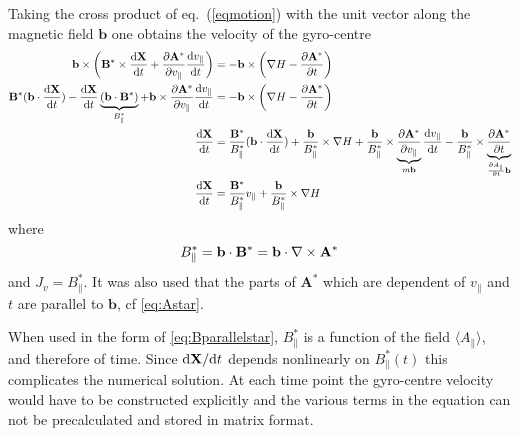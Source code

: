 Taking the cross product of eq.~(\ref{eqmotion}) with the unit vector along the magnetic field $\mathbf{b}$ one obtains the velocity of the gyro-centre 
\begin{align} 
\mathbf{b}\times\left(\mathbf{B}^* \times \frac{\mathrm{d} \bf X}{\mathrm{d} t} + \frac{\partial {\bf A}^*}{\partial v_\parallel} \frac{\mathrm{d} v_\parallel}{\mathrm{d} t} \right)
&= - \mathbf{b}\times\left(\nabla H - \frac{\partial {\bf A}^*}{\partial t}\right)
\\
\mathbf{B}^*(\mathbf{b}\cdot\frac{\mathrm{d} \bf X}{\mathrm{d} t}) - \frac{\mathrm{d} \bf X}{\mathrm{d} t}\underbrace{(\mathbf{b}\cdot\mathbf{B}^*)}_{B^*_\parallel}
+ \mathbf{b}\times\frac{\partial {\bf A}^*}{\partial v_\parallel} \frac{\mathrm{d} v_\parallel}{\mathrm{d} t} 
&= - \mathbf{b}\times\left(\nabla H - \frac{\partial {\bf A}^*}{\partial t}\right)
\\
\frac{\mathrm{d}  {\bf X} }{\mathrm{d}  t}
&= 
\frac{\mathbf{B}^*}{B^*_\parallel}(\mathbf{b}\cdot\frac{\mathrm{d}  {\bf X} }{\mathrm{d}  t})
 + \frac{\mathbf{b}}{B^*_\parallel}\times\nabla H 
+ \frac{\mathbf{b}}{B^*_\parallel}\times\underbrace{\frac{\partial \mathbf{A}^*}{\partial v_\parallel}}_{m\mathbf{b}} \frac{\mathrm{d} v_\parallel}{\mathrm{d} t} 
- \frac{\mathbf{b}}{B^*_\parallel}\times\underbrace{\frac{\partial \mathbf{A}^*}{\partial t}}_{\frac{\partial A_\parallel}{\partial t}\mathbf{b}}
\\
\frac{\mathrm{d} \bf X}{\mathrm{d} t} &= \frac{{\bf B}^*}{B^*_{\parallel}} v_\parallel + \frac{{\bf b}}{B^*_\parallel} \times \nabla H 
\label{eq:gyrocentrevelocity}
\end{align}
where
\begin{equation} 
B_\parallel^* = {\bf b} \cdot {\bf B}^* = {\bf b} \cdot \nabla \times {\bf A}^* 
\label{eq:Bparallelstar}
\end{equation}
and $J_v = B_\parallel^*$. 
It was also used that the parts of $\mathbf{A}^*$ which are dependent of $v_\parallel$ and $t$ are parallel to $\mathbf{b}$, cf \eqref{eq:Astar}.

When used in the form of \eqref{eq:Bparallelstar}, $B_\parallel^*$ is a function of the field $\langle A_\parallel \rangle$, and therefore of time. 
Since ${\rm d} {\bf X} / {\rm d} t$ depends nonlinearly on $B_\parallel^*(t)$ this complicates the numerical solution. At each 
time point the gyro-centre velocity would have to be constructed explicitly and the various terms in the equation can not 
be precalculated and stored in matrix format. 

